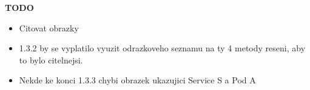 \textbf{TODO}
\begin{itemize}
    \item Citovat obrazky
    \item 1.3.2 by se vyplatilo vyuzit odrazkoveho seznamu na ty 4 metody reseni, aby to bylo citelnejsi.
    \item Nekde ke konci 1.3.3 chybi obrazek ukazujici Service S a Pod A
\end{itemize}





